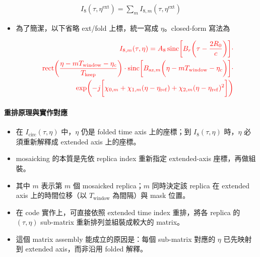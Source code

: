 \documentclass[11pt]{article}
\providecommand{\tightlist}{%
  \setlength{\itemsep}{0pt}\setlength{\parskip}{0pt}}
\begin{document}
\begin{equation}
\begin{aligned}
I_8(\tau,\eta^{\mathrm{ext}})=\sum_m I_{8,m}(\tau,\eta^{\mathrm{ext}})
\end{aligned}
\end{equation}

\begin{itemize}
\tightlist
\item
  為了簡潔，以下省略 ext/fold 上標，統一寫成 \(\eta\)。closed-form
  寫法為
\end{itemize}

\begin{equation}
\begin{aligned}
{\color{red}{I_{8,m}(\tau,\eta)=A_8\,
\mathrm{sinc}\biggl[ B_r\biggl( \tau-\frac{2R_0}{c} \biggr) \biggr]\cdot}}\\
{\color{red}{\qquad \mathrm{rect}\biggl( \frac{\eta-mT_{\mathrm{window}}-\eta_c}{T_{\mathrm{keep}}} \biggr)\cdot
\mathrm{sinc}\biggl[ B_{\mathrm{az},m}\biggl( \eta-mT_{\mathrm{window}}-\eta_c \biggr) \biggr]\cdot}}\\
{\color{red}{\qquad \exp\biggl( -j\biggl[ \chi_{0,m}+\chi_{1,m}(\eta-\eta_{\mathrm{ref}})
+\chi_{2,m}(\eta-\eta_{\mathrm{ref}})^2 \biggr] \biggr)}}
\end{aligned}
\end{equation}

\hypertarget{ux91cdux6392ux539fux7406ux8207ux5be6ux4f5cux5c0dux61c9-1}{%
\paragraph{重排原理與實作對應}\label{ux91cdux6392ux539fux7406ux8207ux5be6ux4f5cux5c0dux61c9-1}}

\begin{itemize}
\tightlist
\item
  在 \(I_{\mathrm{circ}}(\tau,\eta)\) 中，\(\eta\) 仍是 folded time axis
  上的座標；到 \(I_8(\tau,\eta)\) 時，\(\eta\) 必須重新解釋成 extended
  axis 上的座標。
\item
  mosaicking 的本質是先依 replica index 重新指定 extended-axis
  座標，再做組裝。
\item
  其中 \(m\) 表示第 \(m\) 個 mosaicked replica；\(m\) 同時決定該 replica
  在 extended axis 上的時間位移（以 \(T_{\mathrm{window}}\) 為間隔）與
  mask 位置。
\item
  在 code 實作上，可直接依照 extended time index 重排，將各 replica 的
  \((\tau,\eta)\) sub-matrix 重新排列並組裝成較大的 matrix。
\item
  這個 matrix assembly 能成立的原因是：每個 sub-matrix 對應的 \(\eta\)
  已先映射到 extended axis，而非沿用 folded 解釋。
\end{itemize}
\end{document}
